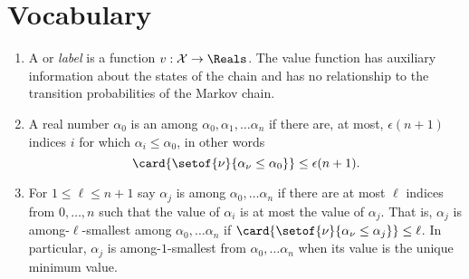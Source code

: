 \documentclass[12pt]{article}
\begin{document}
\section*{Vocabulary}
\begin{enumerate}
    \item
        A  or \emph{label} is a function \( v :
        \mathcal{X} \to \Reals \).  The value function has auxiliary
        information about the states of the chain and has no
        relationship to the transition probabilities of the Markov
        chain.
    \item
        A real number \( \alpha_0 \) is an 
        among \( \alpha_0, \alpha_1, \dots \alpha_n \) if there are, at
        most, \( \epsilon(n + 1) \) indices \( i \) for which \( \alpha_i
        \le \alpha_0 \), in other words
        \[
            \card{ \setof{\nu}{\alpha_{\nu} \le \alpha_0}} \le \epsilon(n+1).
        \]

    \item
        For \( 1 \le \ell \le n+1 \) say \( \alpha_j \) is  among \( \alpha_0, \dots \alpha_n \) if there
        are at most \( \ell \) indices from \( 0, \dots, n \) such that
        the value of \( \alpha_i \) is at most the value of \( \alpha_j \).
        That is, \( \alpha_j \) is among-\( \ell \)-smallest among \(
        \alpha_0, \dots \alpha_n \) if \( \card{ \setof{\nu}{\alpha_\nu
        \le \alpha_j}} \le \ell \).  In particular, \( \alpha_j \) is
        among-\( 1 \)-smallest from \( \alpha_0, \dots \alpha_n \) when
        its value is the unique minimum value.
\end{enumerate}

\hr
\end{document}
